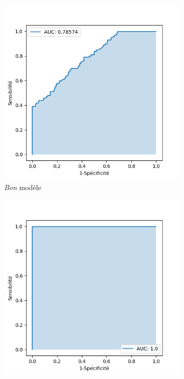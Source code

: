 \begin{figure}[!h]
	\centering
	\begin{subfigure}{.49\textwidth}
		\includegraphics[width=\textwidth]{gnuplot/revue_litterature/AUC/mid_AUC}
		\caption{\textit{Bon} modèle}
	\end{subfigure}
	\begin{subfigure}{.49\textwidth}
		\includegraphics[width=\textwidth]{gnuplot/revue_litterature/AUC/perfect_AUC}

\end{subfigure}
\end{figure}
